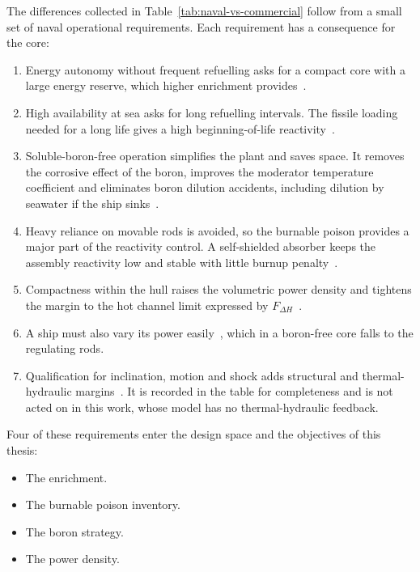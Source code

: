 The differences collected in Table~\ref{tab:naval-vs-commercial} follow
from a small set of naval operational requirements. Each requirement
has a consequence for the core:

\begin{enumerate}
  \item Energy autonomy without frequent refuelling asks for a compact
        core with a large energy reserve, which higher enrichment
        provides~\cite{ippolito_1990}.

  \item High availability at sea asks for long refuelling intervals. The
        fissile loading needed for a long life gives a high
        beginning-of-life reactivity~\cite{alam_partI_2019}.

  \item Soluble-boron-free operation simplifies the plant and saves
        space. It removes the corrosive effect of the boron, improves the
        moderator temperature coefficient and eliminates boron dilution
        accidents, including dilution by seawater if the ship
        sinks~\cite{alam_partI_2019}.

  \item Heavy reliance on movable rods is avoided, so the burnable poison
        provides a major part of the reactivity control. A self-shielded
        absorber keeps the assembly reactivity low and stable with little
        burnup penalty~\cite{alam_partI_2019}.

  \item Compactness within the hull raises the volumetric power density
        and tightens the margin to the hot channel limit expressed by
        $F_{\Delta H}$~\cite{alam_2019_hotchannel}.

  \item A ship must also vary its power easily~\cite{alam_partI_2019},
        which in a boron-free core falls to the regulating rods.

  \item Qualification for inclination, motion and shock adds structural
        and thermal-hydraulic margins~\cite{ritm200n_nei_2024}. It is
        recorded in the table for completeness and is not acted on in
        this work, whose model has no thermal-hydraulic feedback.
\end{enumerate}

Four of these requirements enter the design space and the objectives of
this thesis:

\begin{itemize}
  \item The enrichment.

  \item The burnable poison inventory.

  \item The boron strategy.

  \item The power density.
\end{itemize}

